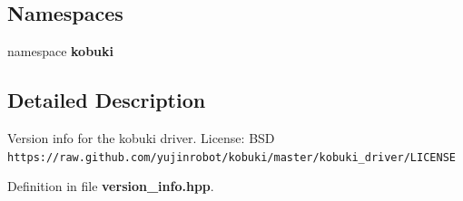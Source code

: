 \subsection*{\-Namespaces}
\begin{DoxyCompactItemize}
\item 
namespace {\bf kobuki}
\end{DoxyCompactItemize}


\subsection{\-Detailed \-Description}
\-Version info for the kobuki driver. \-License\-: \-B\-S\-D {\tt https\-://raw.\-github.\-com/yujinrobot/kobuki/master/kobuki\-\_\-driver/\-L\-I\-C\-E\-N\-S\-E} 

\-Definition in file {\bf version\-\_\-info.\-hpp}.

